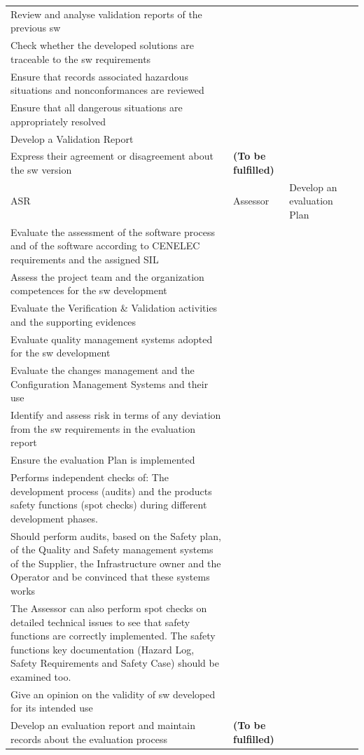 \documentclass{template/openetcs_article}
\begin{document}
\begin{landscape}
\begin{flushleft}
\begin{supertabular}[H]{|m{1cm}|m{2,5cm}|m{15,5cm}|m{6cm}|}
Review and analyse validation reports of the previous sw\\
Check whether the developed solutions are traceable to the sw requirements \\
Ensure that records associated hazardous situations and nonconformances are reviewed\\
Ensure that all dangerous situations are appropriately resolved\\
Develop a Validation Report\\
Express their agreement or disagreement about the sw version  &
\textbf{(To be fulfilled)}
\\\hline
ASR &
Assessor &
\raggedright
Develop an evaluation Plan\\
Evaluate the assessment of the software process and of the software according to CENELEC requirements and the assigned SIL\\
Assess the project team and the organization competences for the sw development\\
Evaluate the Verification \& Validation activities and the supporting evidences\\
Evaluate quality management systems adopted for  the sw development\\
Evaluate the changes management and the Configuration Management Systems and their use\\
Identify and assess risk in terms of any deviation from the sw requirements in the evaluation report\\
Ensure the evaluation Plan is implemented\\
Performs independent checks of: The development process (audits) and the products safety functions (spot checks) during different development phases.\\
Should perform audits, based on the Safety plan, of the Quality and Safety management systems of the Supplier, the Infrastructure owner and the Operator and be convinced that these systems works\\
The Assessor can also perform spot checks on detailed technical issues to see that safety functions are correctly implemented. The safety functions key documentation (Hazard Log, Safety Requirements and Safety Case) should be examined too.\\
Give an opinion on the validity of sw developed for its intended use\\
Develop an evaluation report and maintain records about the evaluation process
&
\textbf{(To be fulfilled)}
\\\hline

\end{supertabular}
\end{flushleft}
\end{landscape}
\end{document}
